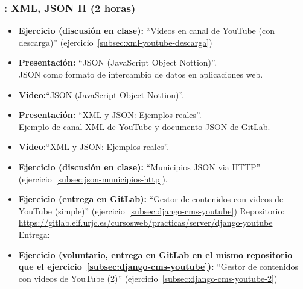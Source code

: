 \documentclass[a4paper,12pt]{article}
\begin{document}
\subsubsection{\juevesJ: XML, JSON II (2 horas)}
\label{cal:juevesJ}

\begin{itemize}
\item \textbf{Ejercicio (discusión en clase):} ``Videos en canal de YouTube (con descarga)'' (ejercicio~\ref{subsec:xml-youtube-descarga})
\item \textbf{Presentación:} ``JSON (JavaScript Object Nottion)''. \\
  JSON como formato de intercambio de datos en aplicaciones web.
\item \textbf{Video:}``JSON (JavaScript Object Nottion)''.
\item \textbf{Presentación:} ``XML y JSON: Ejemplos reales''. \\
  Ejemplo de canal XML de YouTube y documento JSON de GitLab.
\item \textbf{Video:}``XML y JSON: Ejemplos reales''.
\item \textbf{Ejercicio (discusión en clase):} ``Municipios JSON via HTTP'' (ejercicio~\ref{subsec:json-municipios-http}).
\item \textbf{Ejercicio (entrega en GitLab):} ``Gestor de contenidos con videos de YouTube (simple)'' (ejercicio~\ref{subsec:django-cms-youtube})
  Repositorio: \url{https://gitlab.eif.urjc.es/cursosweb/practicas/server/django-youtube} \\
  Entrega: \juevesL
\item \textbf{Ejercicio (voluntario, entrega en GitLab en el mismo repositorio que el ejercicio~\ref{subsec:django-cms-youtube}):} ``Gestor de contenidos con videos de YouTube (2)'' (ejercicio~\ref{subsec:django-cms-youtube-2}) \\
\end{itemize}

\end{document}

